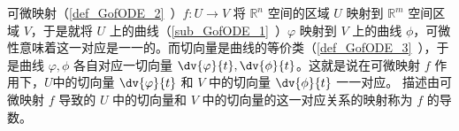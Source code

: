 
可微映射（\autoref{def_GofODE_2}~）$f:U\rightarrow V$ 将 $\mathbb R^n$ 空间的区域 $U$ 映射到 $\mathbb R^m$ 空间区域 $V$，于是就将 $U$ 上的曲线（\autoref{sub_GofODE_1}~）$\varphi$ 映射到 $V$ 上的曲线 $\phi$，可微性意味着这一对应是一一的。而切向量是曲线的等价类（\autoref{def_GofODE_3}~），于是曲线 $\varphi,\phi$ 各自对应一切向量 $\dv{\varphi}{t},\dv{\phi}{t}$。这就是说在可微映射 $f$ 作用下，$U$中的切向量 $\dv{\varphi}{t}$ 和 $V$ 中的切向量 $\dv{\phi}{t}$ 一一对应。 描述由可微映射 $f$ 导致的 $U$ 中的切向量和 $V$ 中的切向量的这一对应关系的映射称为 $f$ 的导数。

